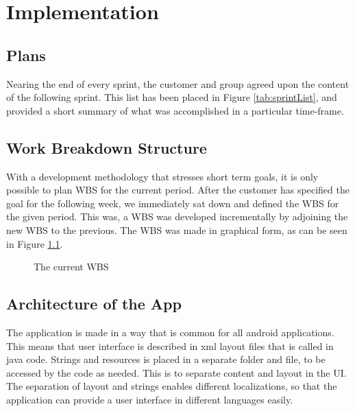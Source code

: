 \chapter{Implementation}
\section{Plans}

Nearing the end of every sprint, the customer and group agreed upon the content of the following sprint. This list has been placed in Figure \ref{tab:sprintList}, and provided a short summary of what was accomplished in a particular time-frame. 

\section{Work Breakdown Structure}
With a development methodology that stresses short term goals, it is only possible to plan WBS for the current period. After the customer has specified the goal for the following week, we immediately sat down and defined the WBS for the given period. This was, a WBS was developed incrementally by adjoining the new WBS to the previous. The WBS was made in graphical form, as can be seen in Figure \ref{fig:WBS}.

\begin{figure}[p]

\setlength\fboxsep{0pt}
\setlength\fboxrule{1pt}\noindent{}
\label{fig:WBS}
\caption{The current WBS}
\end{figure}
\section{Architecture of the App}
The application is made in a way that is common for all android applications. This means that user interface is described in xml layout files that is called in java code. Strings and resources is placed in a separate folder and file, to be accessed by the code as needed. This is to separate content and layout in the UI. The separation of layout and strings enables different localizations, so that the application can provide a user interface in different languages easily.


